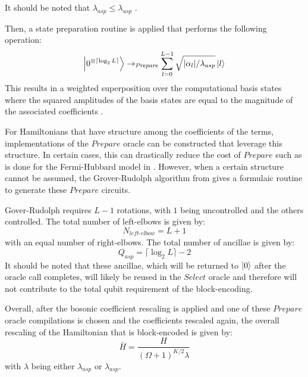 It should be noted that $\lambda_{asp} \leq \lambda_{usp}$  .

Then, a state preparation routine is applied that performs the following operation:
\begin{equation}
    \ket{0^{\otimes \lceil \log_2{L} \rceil}} \rightarrow_{\textit{Prepare}} \sum_{l = 0}^{L-1} \sqrt{|\alpha_l| / \lambda_{asp}} \ket{l}
\end{equation}
This results in a weighted superposition over the computational basis states where the squared amplitudes of the basis states are equal to the magnitude of the associated coefficients .

For Hamiltonians that have structure among the coefficients of the terms, implementations of the $\textit{Prepare}$ oracle can be constructed that leverage this structure.
In certain cases, this can drastically reduce the cost of $\textit{Prepare}$ such as is done for the Fermi-Hubbard model in \cite{babbush2018encoding}.
However, when a certain structure cannot be assumed, the Grover-Rudolph algorithm from \cite{grover2002creating} gives a formulaic routine to generate these $\textit{Prepare}$ circuits.

Gover-Rudolph requires $L-1$ rotations, with $1$ being uncontrolled and the others controlled.
The total number of left-elbows is given by:
\begin{equation}
    N_{\textit{left-elbow}} = L + 1 
\end{equation}
with an equal number of right-elbows.
The total number of ancillae is given by:
\begin{equation}
    Q_{asp} = \lceil \log_2{L} \rceil - 2
\end{equation}
It should be noted that these ancillae, which will be returned to $\ket{0}$ after the oracle call completes, will likely be reused in the $\textit{Select}$ oracle and therefore will not contribute to the total qubit requirement of the block-encoding.

Overall, after the bosonic coefficient rescaling is applied and one of these $Prepare$ oracle compilations is chosen and the coefficients rescaled again, the overall rescaling of the Hamiltonian that is block-encoded is given by:
\begin{equation}
    \bar{H} = \frac{H}{(\Omega + 1)^{K/2} \lambda}
\end{equation}
with $\lambda$ being either $\lambda_{usp}$ or $\lambda_{asp}$.

